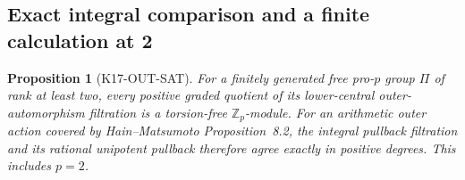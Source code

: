 \documentclass[11pt,a4paper]{article}
\newtheorem{proposition}[theorem]{Proposition}
\theoremstyle{definition}
\begin{document}

\subsection{Exact integral comparison and a finite calculation at 2}

\begin{proposition}[K17-OUT-SAT]\label{prop:outer-sat}
For a finitely generated free pro-$p$ group $\Pi$ of rank at least
two, every positive graded quotient of its lower-central
outer-automorphism filtration is a torsion-free $\mathbb Z_p$-module.
For an arithmetic outer action covered by Hain--Matsumoto
Proposition~8.2, the integral pullback filtration and its rational
unipotent pullback therefore agree exactly in positive degrees.
This includes $p=2$.
\end{proposition}
\end{document}

